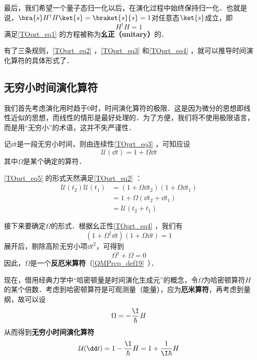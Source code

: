 最后，我们希望一个量子态归一化以后，在演化过程中始终保持归一化．也就是说，$\bra{s}H^\dagger H\ket{s}=\braket{s}{s}=1$对任意态$\ket{s}$成立，即
\begin{equation}\label{TOprt_eq4}
H^\dagger H=1
\end{equation}
满足\autoref{TOprt_eq1} 的方程被称为\textbf{幺正（unitary）}的．



有了三条规则，\autoref{TOprt_eq2} ，\autoref{TOprt_eq3} 和\autoref{TOprt_eq4} ，就可以推导时间演化算符的具体形式了．


\subsection{无穷小时间演化算符}

我们首先考虑演化用时趋于$0$时，时间演化算符的极限．这是因为微分的思想即线性近似的思想，而线性的情形是最好处理的．为了方便，我们将不使用极限语言，而是用“无穷小”的术语，这并不失严谨性．

记$\dd t$是一段无穷小时间，则由连续性\autoref{TOprt_eq3} ，可知应设
\begin{equation}\label{TOprt_eq5}
\mathcal{U}(\dd t) = 1+\Omega \dd t
\end{equation}
其中$\Omega$是某个确定的算符．

\autoref{TOprt_eq5} 的形式天然满足\autoref{TOprt_eq2} ：
\begin{equation}
\begin{aligned}
\mathcal{U}(t_2)\mathcal{U}(t_1)&=(1+\Omega \dd t_2)(1+\Omega \dd t_1)\\
&=1+\Omega(\dd t_2+\dd t_1)\\
&=\mathcal{U}(t_2+t_1)
\end{aligned}
\end{equation}

接下来要确定$\Omega$的形式．根据幺正性\autoref{TOprt_eq4} ，我们有
\begin{equation}
(1+\Omega^\dagger \dd t)(1+\Omega \dd t)=1
\end{equation}
展开后，剔除高阶无穷小项$\dd t^2$，可得到
\begin{equation}
\Omega^\dagger + \Omega = 0
\end{equation}
因此，$\Omega$是一个\textbf{反厄米算符}（\autoref{QMPrcp_def19}~）．


现在，借用经典力学中“哈密顿量是时间演化生成元”的概念，令$\Omega$为哈密顿算符$H$的某个倍数．考虑到哈密顿算符是可观测量（能量），应为\textbf{厄米算符}，再考虑到量纲，故可以设
\begin{equation}\label{TOprt_eq6}
\Omega=-\frac{\I}{\hbar}H
\end{equation}
从而得到\textbf{无穷小时间演化算符}
\begin{equation}\label{TOprt_eq11}
\mathcal{U}(\dd t)= 1-\frac{\I}{\hbar}H=1+\frac{1}{\I\hbar}H
\end{equation}

